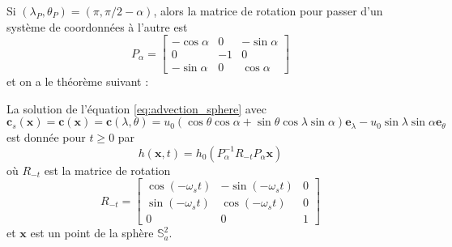 Si $(\lambda_P, \theta_P) = (\pi, \pi / 2 - \alpha)$, alors la matrice de rotation pour passer d'un système de coordonnées à l'autre est
\begin{equation}
P_{\alpha} = \begin{bmatrix}
- \cos \alpha & 0 & - \sin \alpha \\
0 & -1 & 0 \\
- \sin \alpha & 0 & \cos \alpha
\end{bmatrix}
\end{equation}
et on a le théorème suivant :

\begin{theoreme}
La solution de l'équation \eqref{eq:advection_sphere} avec
\begin{equation}
\mathbf{c}_s(\mathbf{x}) = \mathbf{c}(\mathbf{x}) = \mathbf{c}(\lambda, \theta) = u_0 \left( \cos \theta \cos \alpha + \sin \theta \cos \lambda \sin \alpha \right) \mathbf{e}_{\lambda} - u_0 \sin \lambda \sin \alpha \mathbf{e}_{\theta}
\label{eq:rot_solide_1}
\end{equation}
est donnée pour $t \geq 0$ par
\begin{equation}
h(\mathbf{x}, t ) = h_0(P_{\alpha}^{-1}R_{-t}P_{\alpha} \mathbf{x})
\end{equation}
où $R_{-t}$ est la matrice de rotation
\begin{equation}
R_{-t} = \begin{bmatrix}
\cos (- \omega_s t) & - \sin (- \omega_s t) & 0 \\
\sin (- \omega_s t) & \cos (- \omega_s t)   & 0 \\
0 & 0 & 1
\end{bmatrix}
\end{equation}
et $\mathbf{x}$ est un point de la sphère $\mathbb{S}_a^2$.
\end{theoreme}

